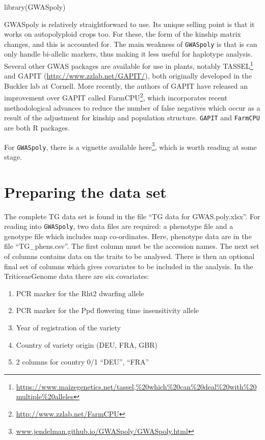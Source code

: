 \documentclass[
]{book}
\newenvironment{Shaded}{\begin{snugshade}}{\end{snugshade}}
\newcommand{\FunctionTok}[1]{\textcolor[rgb]{0.00,0.00,0.00}{#1}}
\newcommand{\NormalTok}[1]{#1}
\providecommand{\tightlist}{%
  \setlength{\itemsep}{0pt}\setlength{\parskip}{0pt}}
\renewcommand{\href}[2]{#2\footnote{\url{#1}}}
\begin{document}
\begin{Shaded}
\begin{Highlighting}[]
\FunctionTok{library}\NormalTok{(GWASpoly)}
\end{Highlighting}
\end{Shaded}

GWASpoly is relatively straightforward to use. Its unique selling point is that it works on autopolyploid crops too. For these, the form of the kinship matrix changes, and this is accounted for. The main weakness of \texttt{GWASpoly} is that is can only handle bi-allelic markers, thus making it less useful for haplotype analysis. Several other GWAS packages are available for use in plants, notably \href{https://www.maizegenetics.net/tassel,\%20which\%20can\%20deal\%20with\%20multiple\%20alleles}{TASSEL} and GAPIT (\url{http://www.zzlab.net/GAPIT/}), both originally developed in the Buckler lab at Cornell. More recently, the authors of GAPIT have released an improvement over GAPIT called \href{http://www.zzlab.net/FarmCPU}{FarmCPU}, which incorporates recent methodological advances to reduce the number of false negatives which occur as a result of the adjustment for kinship and population structure. \texttt{GAPIT} and \texttt{FarmCPU} are both R packages.

For \texttt{GWASpoly}, there is a vignette available \href{www.jendelman.github.io/GWASpoly/GWASpoly.html}{here}, which is worth reading at some stage.

\hypertarget{preparing-the-data-set}{%
\section{Preparing the data set}\label{preparing-the-data-set}}

The complete TG data set is found in the file ``TG data for GWAS.poly.xlsx''. For reading into \texttt{GWASpoly}, two data files are required: a phenotype file and a genotype file which includes map co-ordinates. Here, phenotype data are in the file ``TG\_phens.csv''. The first column must be the accession names. The next set of columns contains data on the traits to be analysed. There is then an optional final set of columns which gives covariates to be included in the analysis. In the TriticeaeGenome data there are six covariates:

\begin{enumerate}
\def\labelenumi{\arabic{enumi}.}
\tightlist
\item
  PCR marker for the Rht2 dwarfing allele
\item
  PCR marker for the Ppd flowering time insensitivity allele
\item
  Year of registration of the variety
\item
  Country of variety origin (DEU, FRA, GBR)
\item
  2 columns for country 0/1 ``DEU'', ``FRA''
\end{enumerate}
\end{document}
